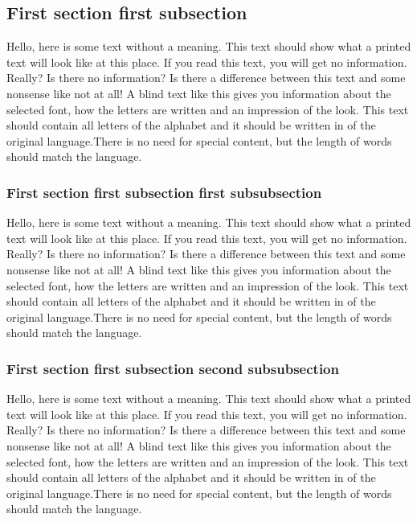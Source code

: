 \documentclass[a4paper,14pt]{extarticle}
\begin{document}
    \subsection{First section first subsection}

    Hello, here is some text without a meaning.  This text should show what 
    a printed text will look like at this place.  If you read this text, 
    you will get no information.  Really?  Is there no information?  Is there 
    a difference between this text and some nonsense like not at all!  A 
    blind text like this gives you information about the selected font, how 
    the letters are written and an impression of the look.  This text should
    contain all letters of the alphabet and it should be written in of the
    original language.There is no need for special content, but the length of
    words should match the language.

    \subsubsection{First section first subsection first subsubsection}

    Hello, here is some text without a meaning.  This text should show what 
    a printed text will look like at this place.  If you read this text, 
    you will get no information.  Really?  Is there no information?  Is there 
    a difference between this text and some nonsense like not at all!  A 
    blind text like this gives you information about the selected font, how 
    the letters are written and an impression of the look.  This text should
    contain all letters of the alphabet and it should be written in of the
    original language.There is no need for special content, but the length of
    words should match the language.

    \subsubsection{First section first subsection second subsubsection}

    Hello, here is some text without a meaning.  This text should show what 
    a printed text will look like at this place.  If you read this text, 
    you will get no information.  Really?  Is there no information?  Is there 
    a difference between this text and some nonsense like not at all!  A 
    blind text like this gives you information about the selected font, how 
    the letters are written and an impression of the look.  This text should
    contain all letters of the alphabet and it should be written in of the
    original language.There is no need for special content, but the length of
    words should match the language.
\end{document}
